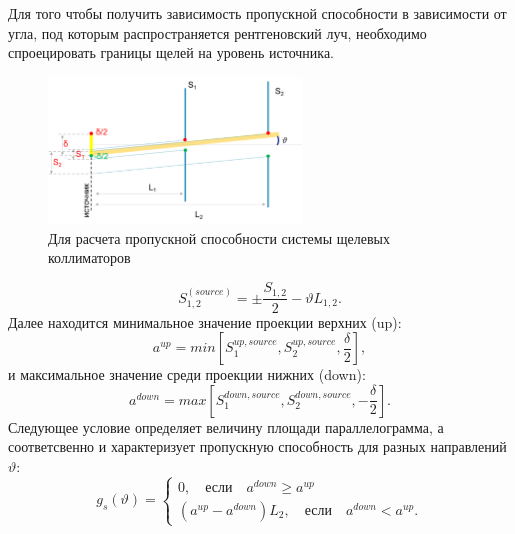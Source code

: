 \newpage
  \section{ }%
  \label{sec:calc_slits_ability}

  Для того чтобы получить зависимость пропускной способности в зависимости от угла,
  под которым распространяется рентгеновский луч, необходимо спроецировать границы
  щелей на уровень источника.
\begin{figure}[H]
  \centering
  \includegraphics[width=0.6\textwidth]{images/calc_slits_ability.png}
  \caption{Для расчета пропускной способности системы щелевых коллиматоров}
  \label{ris:calc_slits_ability}
\end{figure}
$$ S^{(source)}_{1,2} = \pm \frac{S_{1,2}}{2} - \vartheta L_{1,2}.$$
 Далее находится минимальное значение проекции верхних (up):
 $$ a^{up} = min [S_1^{up,source},S_2^{up,source},\frac{\delta}{2}],$$
и максимальное значение среди проекции нижних (down):
$$ a^{down} = max [S_1^{down,source},S_2^{down,source},-\frac{\delta}{2}].$$
Следующее условие определяет величину площади параллелограмма, а соответсвенно
и характеризует пропускную способность для разных направлений $\vartheta$:
\begin{equation}
  g_s(\vartheta) =
 \begin{cases}
   0, \quad \text{если} \quad a^{down} \geq a^{up}
   \\
    (a^{up} - a^{down})L_2,\quad \text{если} \quad a^{down} < a^{up}.
 \end{cases}
\end{equation}
